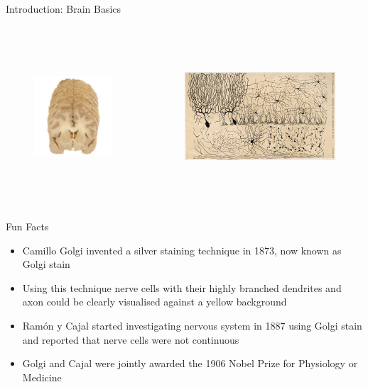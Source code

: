 \documentclass{beamer} %
\begin{document}
\begin{frame}{Introduction: Brain Basics}
\begin{columns}
\begin{column}{0.65\textwidth}
   \begin{figure}
       \centering
       \includegraphics[height = 6cm, keepaspectration]{image_580babe38498c_nvs-042a-2-500x500.jpg}
   \end{figure}
\end{column}
\begin{column}{0.35\textwidth}  %
    \begin{figure}
        \includegraphics[width=\textwidth, height = 6cm]{CajalCerebellum.jpg}
    \end{figure}
\end{column}
\end{columns}
\end{frame}
\begin{frame}{Fun Facts}
\begin{itemize}
    \item Camillo Golgi invented a silver staining technique in 1873, now known as Golgi stain
    \pause
    \item Using this technique nerve cells with their highly branched dendrites and axon could be clearly visualised against a yellow background
    \pause
    \item Ramón y Cajal started investigating nervous system in 1887 using Golgi stain and reported that nerve cells were not continuous 
    \pause
    \item Golgi and Cajal were jointly awarded the 1906 Nobel Prize for Physiology or Medicine
\end{itemize}
\end{frame}
\end{document}
